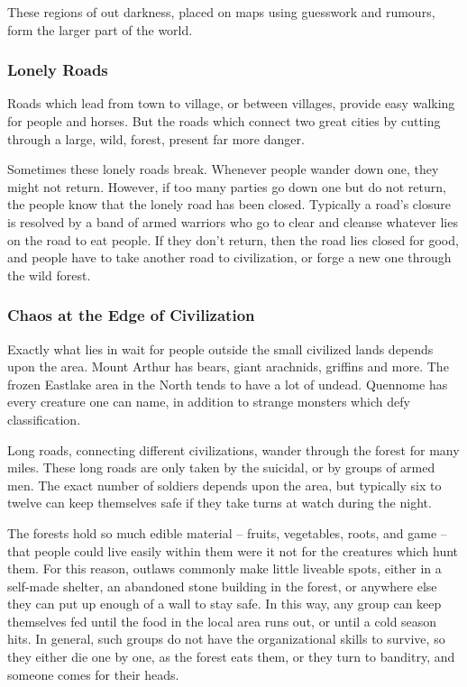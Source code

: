 \begin{multicols}{2}
These regions of out darkness, placed on maps using guesswork and rumours, form the larger part of the world.

\subsubsection{Lonely Roads}

Roads which lead from town to village, or between villages, provide easy walking for people and horses.
But the roads which connect two great cities by cutting through a large, wild, forest, present far more danger.

Sometimes these lonely roads break.
Whenever people wander down one, they might not return.
However, if too many parties go down one but do not return, the people know that the lonely road has been closed.
Typically a  road's closure is resolved by a band of armed warriors who go to clear and cleanse whatever lies on the road to eat people.
If they don't return, then the road lies closed for good, and people have to take another road to civilization, or forge a new one through the wild forest.

\subsubsection{Chaos at the Edge of Civilization}

Exactly what lies in wait for people outside the small civilized lands depends upon the area.
Mount Arthur has bears, giant arachnids, griffins and more.
The frozen Eastlake area in the North tends to have a lot of undead.
Quennome has every creature one can name, in addition to strange monsters which defy classification.

Long roads, connecting different civilizations, wander through the forest for many miles.
These long roads are only taken by the suicidal, or by groups of armed men.
The exact number of soldiers depends upon the area, but typically six to twelve can keep themselves safe if they take turns at watch during the night.

The forests hold so much edible material -- fruits, vegetables, roots, and game -- that people could live easily within them were it not for the creatures which hunt them.
For this reason, outlaws commonly make little liveable spots, either in a self-made shelter, an abandoned stone building in the forest, or anywhere else they can put up enough of a wall to stay safe.
In this way, any group can keep themselves fed until the food in the local area runs out, or until a cold season hits.
In general, such groups do not have the organizational skills to survive, so they either die one by one, as the forest eats them, or they turn to banditry, and someone comes for their heads.


\end{multicols}
